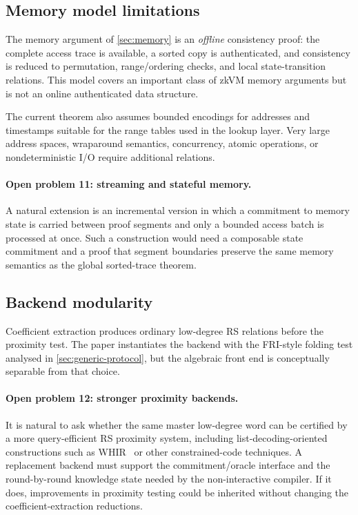 \subsection{Memory model limitations}
\label{sec:limitations-memory-model}

The memory argument of \cref{sec:memory} is an \emph{offline} consistency proof: the complete access trace is available, a sorted copy is authenticated, and consistency is reduced to permutation, range/ordering checks, and local state-transition relations.  This model covers an important class of zkVM memory arguments but is not an online authenticated data structure.

The current theorem also assumes bounded encodings for addresses and timestamps suitable for the range tables used in the lookup layer.  Very large address spaces, wraparound semantics, concurrency, atomic operations, or nondeterministic I/O require additional relations.

\paragraph{Open problem 11: streaming and stateful memory.}
A natural extension is an incremental version in which a commitment to memory state is carried between proof segments and only a bounded access batch is processed at once.  Such a construction would need a composable state commitment and a proof that segment boundaries preserve the same memory semantics as the global sorted-trace theorem.

\subsection{Backend modularity}
\label{sec:limitations-backend}

Coefficient extraction produces ordinary low-degree RS relations before the proximity test.  The paper instantiates the backend with the FRI-style folding test analysed in \cref{sec:generic-protocol}, but the algebraic front end is conceptually separable from that choice.

\paragraph{Open problem 12: stronger proximity backends.}
It is natural to ask whether the same master low-degree word can be certified by a more query-efficient RS proximity system, including list-decoding-oriented constructions such as WHIR~\cite{WHIR24} or other constrained-code techniques.  A replacement backend must support the commitment/oracle interface and the round-by-round knowledge state needed by the non-interactive compiler.  If it does, improvements in proximity testing could be inherited without changing the coefficient-extraction reductions.

